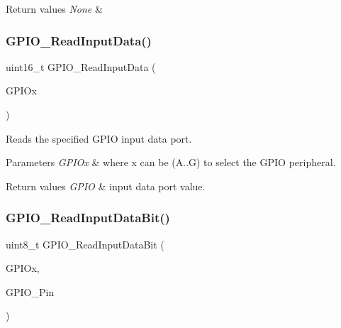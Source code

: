 \begin{DoxyRetVals}{Return values}
{\em None} & \\
\hline
\end{DoxyRetVals}
\mbox{\label{group___g_p_i_o___exported___functions_ga139a33adc8409288e9f193bbebb5a0f7}} 
\subsubsection{\texorpdfstring{GPIO\_ReadInputData()}{GPIO\_ReadInputData()}}
{\footnotesize\ttfamily uint16\+\_\+t G\+P\+I\+O\+\_\+\+Read\+Input\+Data (\begin{DoxyParamCaption}\item[{\mbox{\hyperlink{struct_g_p_i_o___type_def}{G\+P\+I\+O\+\_\+\+Type\+Def}} $\ast$}]{G\+P\+I\+Ox }\end{DoxyParamCaption})}



Reads the specified G\+P\+IO input data port. 


\begin{DoxyParams}{Parameters}
{\em G\+P\+I\+Ox} & where x can be (A..G) to select the G\+P\+IO peripheral. \\
\hline
\end{DoxyParams}

\begin{DoxyRetVals}{Return values}
{\em G\+P\+IO} & input data port value. \\
\hline
\end{DoxyRetVals}
\mbox{\label{group___g_p_i_o___exported___functions_ga98772ef6b639b3fa06c8ae5ba28d3aaa}} 
\subsubsection{\texorpdfstring{GPIO\_ReadInputDataBit()}{GPIO\_ReadInputDataBit()}}
{\footnotesize\ttfamily uint8\+\_\+t G\+P\+I\+O\+\_\+\+Read\+Input\+Data\+Bit (\begin{DoxyParamCaption}\item[{\mbox{\hyperlink{struct_g_p_i_o___type_def}{G\+P\+I\+O\+\_\+\+Type\+Def}} $\ast$}]{G\+P\+I\+Ox,  }\item[{uint16\+\_\+t}]{G\+P\+I\+O\+\_\+\+Pin }\end{DoxyParamCaption})}



